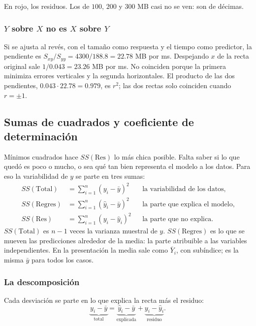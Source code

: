 \documentclass[11pt,letterpaper]{article}
\begin{document}
En rojo, los residuos. Los de $100$, $200$ y $300$ MB casi no se ven:
son de décimas.

\subsubsection*{$Y$ sobre $X$ no es $X$ sobre $Y$}

Si se ajusta al revés, con el tamaño como respuesta y el tiempo como
predictor, la pendiente es $S_{xy} / S_{yy} = 4300 / 188.8 = 22.78$ MB
por ms. Despejando $x$ de la recta original sale $1 / 0.043 = 23.26$
MB por ms. No coinciden porque la primera minimiza errores verticales y
la segunda horizontales. El producto de las dos pendientes,
$0.043 \cdot 22.78 = 0.979$, es $r^2$; las dos rectas solo coinciden
cuando $r = \pm 1$.


\subsection*{Sumas de cuadrados y coeficiente de determinación}

Mínimos cuadrados hace $SS(\mathrm{Res})$ lo más chica posible. Falta
saber si lo que quedó es poco o mucho, o sea qué tan bien representa el
modelo a los datos. Para eso la variabilidad de $y$ se parte en tres
sumas:
\begin{align*}
    SS(\mathrm{Total}) &= \sum_{i=1}^{n} (y_i - \bar{y})^2
    && \text{la variabilidad de los datos,} \\
    SS(\mathrm{Regres}) &= \sum_{i=1}^{n} (\hat{y}_i - \bar{y})^2
    && \text{la parte que explica el modelo,} \\
    SS(\mathrm{Res}) &= \sum_{i=1}^{n} (y_i - \hat{y}_i)^2
    && \text{la parte que no explica.}
\end{align*}
$SS(\mathrm{Total})$ es $n - 1$ veces la varianza muestral de $y$.
$SS(\mathrm{Regres})$ es lo que se mueven las predicciones alrededor de
la media: la parte atribuible a las variables independientes. En la
presentación la media sale como $\bar{Y}_i$, con subíndice; es la misma
$\bar{y}$ para todos los casos.

\subsubsection*{La descomposición}

Cada desviación se parte en lo que explica la recta más el residuo:
\[
    \underbrace{y_i - \bar{y}}_{\text{total}}
    = \underbrace{\hat{y}_i - \bar{y}}_{\text{explicada}}
    + \underbrace{y_i - \hat{y}_i}_{\text{residuo}} .
\]
\end{document}
